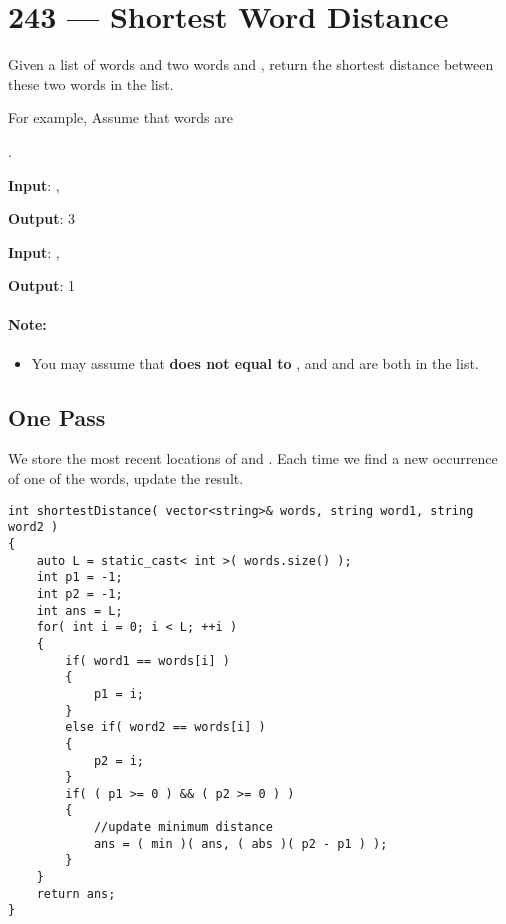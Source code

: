 \section{243 --- Shortest Word Distance}
Given a list of words and two words  and , return the shortest distance between these two words in the list.

For example, Assume that words are 

.

\begin{flushleft}

\textbf{Input}: , 

\textbf{Output}: 3

\textbf{Input}: , 

\textbf{Output}: 1
\end{flushleft}

\paragraph{Note:}
\begin{itemize}
\item You may assume that  \textbf{does not equal to} , and  and  are both in the list.
\end{itemize}

\subsection{One Pass}
We store the most recent locations of  and . Each time we find a new occurrence of one of the words, update the result.

\setcounter{lstlisting}{0}
\begin{lstlisting}[style=customc, caption={One Pass}]
int shortestDistance( vector<string>& words, string word1, string word2 )
{
    auto L = static_cast< int >( words.size() );
    int p1 = -1;
    int p2 = -1;
    int ans = L;
    for( int i = 0; i < L; ++i )
    {
        if( word1 == words[i] )
        {
            p1 = i;
        }
        else if( word2 == words[i] )
        {
            p2 = i;
        }
        if( ( p1 >= 0 ) && ( p2 >= 0 ) )
        {
            //update minimum distance
            ans = ( min )( ans, ( abs )( p2 - p1 ) );
        }
    }
    return ans;
}
\end{lstlisting}
